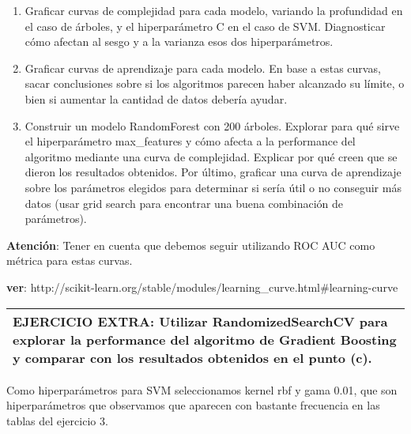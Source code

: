 \documentclass[11pt]{article}
\providecommand{\tightlist}{%
      \setlength{\itemsep}{0pt}\setlength{\parskip}{0pt}}
\begin{document}
\begin{enumerate}
\def\labelenumi{\arabic{enumi}.}
\tightlist
\item
  Graficar curvas de complejidad para cada modelo, variando la
  profundidad en el caso de árboles, y el hiperparámetro C en el caso de
  SVM. Diagnosticar cómo afectan al sesgo y a la varianza esos dos
  hiperparámetros.
\item
  Graficar curvas de aprendizaje para cada modelo. En base a estas
  curvas, sacar conclusiones sobre si los algoritmos parecen haber
  alcanzado su límite, o bien si aumentar la cantidad de datos debería
  ayudar.
\item
  Construir un modelo RandomForest con 200 árboles. Explorar para qué
  sirve el hiperparámetro max\_features y cómo afecta a la performance
  del algoritmo mediante una curva de complejidad. Explicar por qué
  creen que se dieron los resultados obtenidos. Por último, graficar una
  curva de aprendizaje sobre los parámetros elegidos para determinar si
  sería útil o no conseguir más datos (usar grid search para encontrar
  una buena combinación de parámetros).
\end{enumerate}

\textbf{Atención}: Tener en cuenta que debemos seguir utilizando ROC AUC
como métrica para estas curvas.

\textbf{ver}:
http://scikit-learn.org/stable/modules/learning\_curve.html\#learning-curve

\begin{longtable}[]{@{}l@{}}
\toprule
\begin{minipage}[t]{0.05\columnwidth}\raggedright\strut
\textbf{EJERCICIO EXTRA:} Utilizar RandomizedSearchCV para explorar la
performance del algoritmo de Gradient Boosting y comparar con los
resultados obtenidos en el punto (c).\strut
\end{minipage}\tabularnewline
\bottomrule
\end{longtable}

    Como hiperparámetros para SVM seleccionamos kernel rbf y gama 0.01, que
son hiperparámetros que observamos que aparecen con bastante frecuencia
en las tablas del ejercicio 3.
\end{document}

